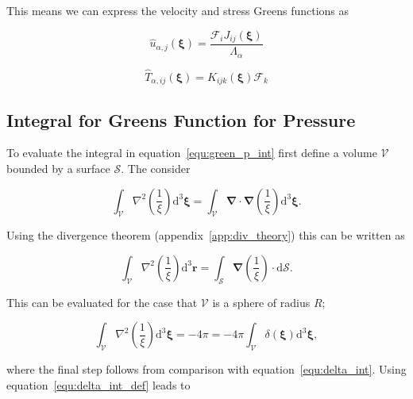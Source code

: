 \documentclass[12pt]{article}
\begin{document}
This means we can express the velocity and stress Greens functions as

\begin{equation}
\label{equ:u_green}
\hat{u}_{\alpha,j}(\boldsymbol\xi) = \frac{\mathcal{F}_{i} J_{ij} (\boldsymbol\xi)}{\Lambda_{\alpha}}
\end{equation}

\begin{equation}
\label{equ:stress_green}
\hat{T}_{\alpha, ij}(\boldsymbol\xi) = K_{ijk} (\boldsymbol\xi) \mathcal{F}_{k}
\end{equation}

\subsection{Integral for Greens Function for Pressure}
\label{sub_app:green_p}

To evaluate the integral in equation~\ref{equ:green_p_int} first define a volume $\mathcal{V}$ bounded by a surface $\mathcal{S}$. The consider

\begin{equation}
\label{equ:int_del_recip}
\int_{\mathcal{V}} \nabla^{2} \left(\frac{1}{\xi}\right) \mathrm{d} ^{3} \boldsymbol{\xi} = \int_{\mathcal{V}} \boldsymbol{\nabla} \cdot \boldsymbol{\nabla} \left(\frac{1}{\xi}\right) \mathrm{d} ^{3} \boldsymbol{\xi} .
\end{equation}

Using the divergence theorem (appendix~\ref{app:div_theory}) this can be written as

\begin{equation}
\label{equ:sint_del_recip}
\int_{\mathcal{V}} \nabla^{2} \left(\frac{1}{\xi}\right) \mathrm{d} ^{3} \boldsymbol{r} = \int_{\mathcal{S}} \boldsymbol{\nabla} \left(\frac{1}{\xi}\right) \cdot \mathrm{d} \mathcal{S} .
\end{equation}

This can be evaluated for the case that $\mathcal{V}$ is a sphere of radius $R$;

\begin{equation}
\label{equ:int_del_recip_eval}
\int_{\mathcal{V}} \nabla^{2} \left(\frac{1}{\xi}\right) \mathrm{d} ^{3} \boldsymbol{\xi} = - 4 \pi = -4 \pi \int_{\mathcal{V}} \delta(\boldsymbol{\xi}) \mathrm{d}^{3} \boldsymbol{\xi} ,
\end{equation}

where the final step follows from comparison with equation~\ref{equ:delta_int}. Using equation~\ref{equ:delta_int_def} leads to
\end{document}
